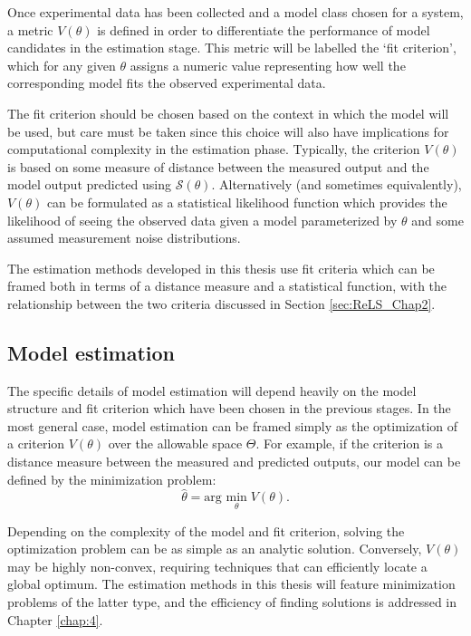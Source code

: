 Once experimental data has been collected and a model class chosen for a system, a metric $V(\theta)$ is defined in order to differentiate the performance of model candidates in the estimation stage. This metric will be labelled the `fit criterion', which for any given $\theta$ assigns a numeric value representing how well the corresponding model fits the observed experimental data. 

The fit criterion should be chosen based on the context in which the model will be used, but care must be taken since this choice will also have implications for computational complexity in the estimation phase. Typically, the criterion $V(\theta)$ is based on some measure of distance between the measured output and the model output predicted using $\mathcal{S}(\theta)$. Alternatively (and sometimes equivalently), $V(\theta)$ can be formulated as a statistical likelihood function which provides the likelihood of seeing the observed data given a model parameterized by $\theta$ and some assumed measurement noise distributions. 

The estimation methods developed in this thesis use fit criteria which can be framed both in terms of a distance measure and a statistical function, with the relationship between the two criteria discussed in Section \ref{sec:ReLS_Chap2}.

\subsection{Model estimation}

The specific details of model estimation will depend heavily on the model structure and fit criterion which have been chosen in the previous stages. In the most general case, model estimation can be framed simply as the optimization of a criterion $V(\theta)$ over the allowable space $\Theta$. For example, if the criterion is a distance measure between the measured and predicted outputs, our model can be defined by the minimization problem:
\begin{equation}
\hat{\theta} = \text{arg } \underset{\theta}{\text{min}} \; V(\theta).
\end{equation}

Depending on the complexity of the model and fit criterion, solving the optimization problem can be as simple as an analytic solution. Conversely, $V(\theta)$ may be highly non-convex, requiring techniques that can efficiently locate a global optimum. The estimation methods in this thesis will feature minimization problems of the latter type, and the efficiency of finding solutions is addressed in Chapter \ref{chap:4}.


